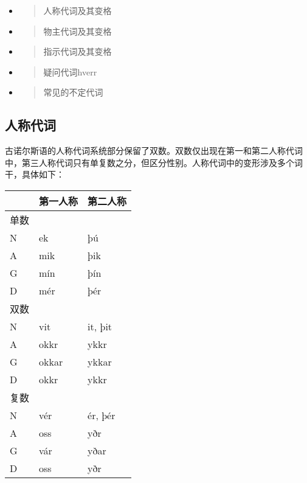 \begin{itemize}
\item
  \begin{quote}
  人称代词及其变格
  \end{quote}
\item
  \begin{quote}
  物主代词及其变格
  \end{quote}
\item
  \begin{quote}
  指示代词及其变格
  \end{quote}
\item
  \begin{quote}
  疑问代词hverr
  \end{quote}
\item
  \begin{quote}
  常见的不定代词
  \end{quote}
\end{itemize}

\subsection{人称代词}\label{ux4ebaux79f0ux4ee3ux8bcd}

古诺尔斯语的人称代词系统部分保留了双数。双数仅出现在第一和第二人称代词中，第三人称代词只有单复数之分，但区分性别。人称代词中的变形涉及多个词干，具体如下：

\begin{longtable}{lll}
\toprule
 & 第一人称 & 第二人称 \\
\midrule
\endhead
\bottomrule
\endfoot
单数 & & \\
N & ek & þú \\
A & mik & þik \\
G & mín & þín \\
D & mér & þér \\
双数 & & \\
N & vit & it, þit \\
A & okkr & ykkr \\
G & okkar & ykkar \\
D & okkr & ykkr \\
复数 & & \\
N & vér & ér, þér \\
A & oss & yðr \\
G & vár & yðar \\
D & oss & yðr \\
\end{longtable}

